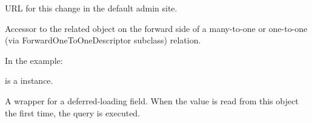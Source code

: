 \documentclass[letterpaper,10pt,english]{sphinxmanual}
\begin{document}
\begin{fulllineitems}
\begin{fulllineitems}
\end{fulllineitems}


\begin{fulllineitems}
\label{\detokenize{modules/models:users.models.HistoricalCotisationHistory.revert_url}}
URL for this change in the default admin site.

\end{fulllineitems}


\begin{fulllineitems}
\label{\detokenize{modules/models:users.models.HistoricalCotisationHistory.user}}
Accessor to the related object on the forward side of a many-to-one or
one-to-one (via ForwardOneToOneDescriptor subclass) relation.

In the example:

\begin{sphinxVerbatim}[commandchars=\\\{\}]
 
       
\end{sphinxVerbatim}

 is a  instance.

\end{fulllineitems}


\begin{fulllineitems}
\label{\detokenize{modules/models:users.models.HistoricalCotisationHistory.user_id}}
A wrapper for a deferred-loading field. When the value is read from this
object the first time, the query is executed.

\end{fulllineitems}


\end{fulllineitems}
\end{document}
